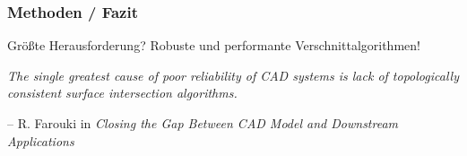 \documentclass[8pt, aspectratio=169]{beamer}
\begin{document}
\begin{frame}
	\frametitle{Methoden / Fazit}
	\vspace{-1cm}\hspace{-0.5cm}
	\begin{minipage}[t]{\textwidth}
		\begin{center}
		Größte Herausforderung? Robuste und performante Verschnittalgorithmen!
		\end{center}
		\vspace{0.5cm}
		\begin{center}
		\emph{\glqq The single greatest cause of poor reliability of CAD systems is lack of topologically consistent surface intersection algorithms.\grqq}
		\end{center}
		\vspace{0.5cm}
		\flushright -- R. Farouki in \emph{\glqq Closing the Gap Between CAD Model and Downstream Applications\grqq}
	\end{minipage}
\end{frame}
\end{document}
